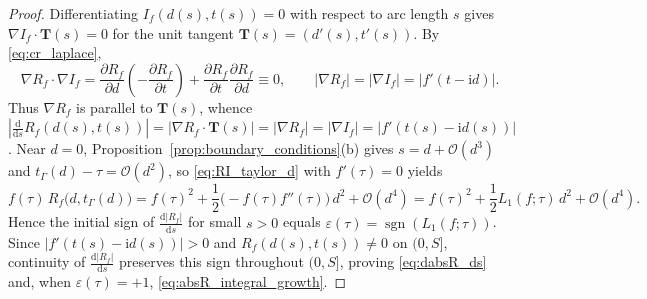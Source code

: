 \documentclass[11pt,a4paper,reqno]{amsart}
\theoremstyle{definition}
\theoremstyle{remark}
\numberwithin{equation}{section}
\newcommand{\dd}{\mathrm{d}}
\newcommand{\ii}{\mathrm{i}}
\begin{document}
\begin{proof}
Differentiating $I_f(d(s), t(s)) = 0$ with respect to arc length $s$ gives $\nabla I_f \cdot \mathbf{T}(s) = 0$ for the unit tangent $\mathbf{T}(s) = (d'(s), t'(s))$. By \eqref{eq:cr_laplace},
\begin{equation}\label{eq:cr_orthogonality}
\nabla R_f \cdot \nabla I_f = \frac{\partial R_f}{\partial d}\left(-\frac{\partial R_f}{\partial t}\right) + \frac{\partial R_f}{\partial t}\frac{\partial R_f}{\partial d} \equiv 0, \qquad
\big|\nabla R_f\big| = \big|\nabla I_f\big| = \big|f'(t - \ii d)\big|.
\end{equation}
Thus $\nabla R_f$ is parallel to $\mathbf{T}(s)$, whence $|\frac{\dd}{\dd s}R_f(d(s),t(s))| = |\nabla R_f \cdot \mathbf{T}(s)| = |\nabla R_f| = |\nabla I_f| = |f'(t(s)-\ii d(s))|$. Near $d = 0$, Proposition~\ref{prop:boundary_conditions}(b) gives $s = d + \mathcal{O}(d^3)$ and $t_\Gamma(d) - \tau = \mathcal{O}(d^2)$, so \eqref{eq:RI_taylor_d} with $f'(\tau) = 0$ yields
\[
f(\tau)\,R_f\big(d, t_\Gamma(d)\big) = f(\tau)^2 + \frac{1}{2}\big(-f(\tau)f''(\tau)\big)\,d^2 + \mathcal{O}(d^4) = f(\tau)^2 + \frac{1}{2}L_1(f;\tau)\,d^2 + \mathcal{O}(d^4).
\]
Hence the initial sign of $\frac{\dd|R_f|}{\dd s}$ for small $s > 0$ equals $\varepsilon(\tau) = \operatorname{sgn}(L_1(f;\tau))$. Since $|f'(t(s)-\ii d(s))| > 0$ and $R_f(d(s),t(s)) \neq 0$ on $(0, S]$, continuity of $\frac{\dd|R_f|}{\dd s}$ preserves this sign throughout $(0, S]$, proving \eqref{eq:dabsR_ds} and, when $\varepsilon(\tau) = +1$, \eqref{eq:absR_integral_growth}.
\end{proof}
\end{document}
